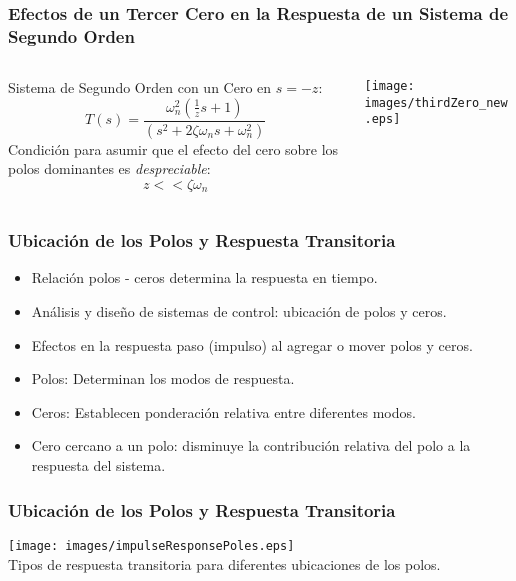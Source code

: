 \documentclass[aspectratio=169,handout]{beamer}
\theoremstyle{definition}
\theoremstyle{plain}
\theoremstyle{remark}
\begin{document}
\begin{frame}[<+->]\frametitle{Efectos de un Tercer Cero en la Respuesta de un Sistema de Segundo Orden}
\vspace*{5mm}
\begin{columns}
\begin{column}{0.5\textwidth}
Sistema de Segundo Orden con un Cero en $s=-z$: 
\begin{equation*}
	T(s) = \frac{\omega_n^2(\frac{1}{z}s+1)}{(s^2+2 \zeta \omega_n s + \omega_n^2)}
\end{equation*}
Condición para asumir que el efecto del cero sobre los polos dominantes es \textit{despreciable}:
\begin{equation*}
	z << \zeta \omega_n
\end{equation*}
\end{column}	
\begin{column}{0.5\textwidth}
\centering
\texttt{[image: images/thirdZero\_new.eps]}
\end{column}	
\end{columns}
\end{frame}

\begin{frame}[<+->]\frametitle{Ubicación de los Polos y Respuesta Transitoria}
\begin{itemize}
	\item Relación polos - ceros determina la respuesta en tiempo.
	\item Análisis y diseño de sistemas de control: ubicación de polos y ceros.
	\item Efectos en la respuesta paso (impulso) al agregar o mover polos y ceros.
	\item Polos: Determinan los modos de respuesta.
	\item Ceros: Establecen ponderación relativa entre diferentes modos.
	\item Cero cercano a un polo: disminuye la contribución relativa del polo a la respuesta del sistema.
\end{itemize}
\end{frame}

\begin{frame}[c]\frametitle{Ubicación de los Polos y Respuesta Transitoria}
\centering
\texttt{[image: images/impulseResponsePoles.eps]}\\
Tipos de respuesta transitoria para diferentes ubicaciones de los polos.
\end{frame}
\end{document}
